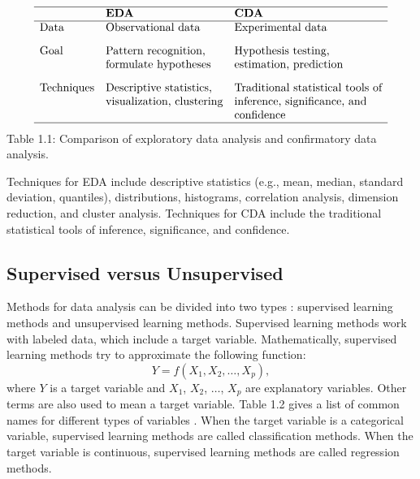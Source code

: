 \documentclass[]{book}
\theoremstyle{definition}
\theoremstyle{definition}
\theoremstyle{definition}
\theoremstyle{remark}
\begin{document}
\[\begin{matrix}
\begin{array}{lll} \hline
 & \textbf{EDA} & \textbf{CDA} \\\hline
\text{Data} & \text{Observational data} & \text{Experimental data}\\[3mm]
\text{Goal} & \text{Pattern recognition,}  & \text{Hypothesis testing,}  \\
& \text{formulate hypotheses} & \text{estimation, prediction} \\[3mm]
\text{Techniques} & \text{Descriptive statistics,} & \text{Traditional statistical tools of} \\
& \text{visualization, clustering} & \text{inference, significance, and}\\
& & \text{confidence} \\
\hline
\end{array}
\end{matrix}
\] Table 1.1: Comparison of exploratory data analysis and confirmatory
data analysis.

Techniques for EDA include descriptive statistics (e.g., mean, median,
standard deviation, quantiles), distributions, histograms, correlation
analysis, dimension reduction, and cluster analysis. Techniques for CDA
include the traditional statistical tools of inference, significance,
and confidence.

\subsection{Supervised versus
Unsupervised}\label{supervised-versus-unsupervised}

Methods for data analysis can be divided into two types
\citep{abbott2014, igual2017}: supervised learning methods and
unsupervised learning methods. Supervised learning methods work with
labeled data, which include a target variable. Mathematically,
supervised learning methods try to approximate the following function:
\[
Y = f(X_1, X_2, \ldots, X_p),
\] where \(Y\) is a target variable and \(X_1\), \(X_2\), \(\ldots\),
\(X_p\) are explanatory variables. Other terms are also used to mean a
target variable. Table 1.2 gives a list of common names for different
types of variables \citep{frees2009}. When the target variable is a
categorical variable, supervised learning methods are called
classification methods. When the target variable is continuous,
supervised learning methods are called regression methods.
\end{document}
